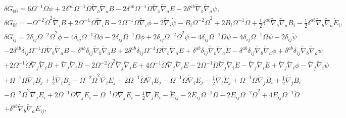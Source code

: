 \documentclass[aps]{revtex4}
\begin{document}
\begin{eqnarray}
&&\delta G_{00}=6 \Omega^{-1} \dot{\Omega} \dot{\psi} + 2 \delta^{ab} \Omega^{-1} \dot{\Omega} \tilde{\nabla}_{b}\tilde{\nabla}_{a}B - 2 \delta^{ab} \Omega^{-1} \dot{\Omega} \tilde{\nabla}_{b}\tilde{\nabla}_{a}\dot{E} - 2 \delta^{ab} \tilde{\nabla}_{b}\tilde{\nabla}_{a}\psi,
\nonumber\\
&&\delta G_{0i}=- \Omega^{-2} \dot{\Omega}^2 \tilde{\nabla}_{i}B + 2 \Omega^{-1} \ddot{\Omega} \tilde{\nabla}_{i}B - 2 \Omega^{-1} \dot{\Omega} \tilde{\nabla}_{i}\phi - 2 \tilde{\nabla}_{i}\dot{\psi}
- B_{i} \Omega^{-2} \dot{\Omega}^2 + 2 B_{i} \Omega^{-1} \ddot{\Omega} + \tfrac{1}{2} \delta^{ab} \tilde{\nabla}_{b}\tilde{\nabla}_{a}B_{i} -  \tfrac{1}{2} \delta^{ab} \tilde{\nabla}_{b}\tilde{\nabla}_{a}\dot{E}_{i},
\nonumber\\
&&\delta G_{ij}=2 \delta_{ij} \Omega^{-2} \dot{\Omega}^2 \phi - 4 \delta_{ij} \Omega^{-1} \ddot{\Omega} \phi - 2 \delta_{ij} \Omega^{-1} \dot{\Omega} \dot{\phi} + 2 \delta_{ij} \Omega^{-2} \dot{\Omega}^2 \psi - 4 \delta_{ij} \Omega^{-1} \ddot{\Omega} \psi - 4 \delta_{ij} \Omega^{-1} \dot{\Omega} \dot{\psi} - 2 \delta_{ij} \ddot{\psi} 
\nonumber\\
&&- 2 \delta^{ab} \delta_{ij} \Omega^{-1} \dot{\Omega} \tilde{\nabla}_{b}\tilde{\nabla}_{a}B -  \delta^{ab} \delta_{ij} \tilde{\nabla}_{b}\tilde{\nabla}_{a}\dot{B} + 2 \delta^{ab} \delta_{ij} \Omega^{-1} \dot{\Omega} \tilde{\nabla}_{b}\tilde{\nabla}_{a}\dot{E} + \delta^{ab} \delta_{ij} \tilde{\nabla}_{b}\tilde{\nabla}_{a}\ddot{E} -  \delta^{ab} \delta_{ij} \tilde{\nabla}_{b}\tilde{\nabla}_{a}\phi + \delta^{ab} \delta_{ij} \tilde{\nabla}_{b}\tilde{\nabla}_{a}\psi 
\nonumber\\
&&+ 2 \Omega^{-1} \dot{\Omega} \tilde{\nabla}_{j}\tilde{\nabla}_{i}B + \tilde{\nabla}_{j}\tilde{\nabla}_{i}\dot{B} - 2 \Omega^{-2} \dot{\Omega}^2 \tilde{\nabla}_{j}\tilde{\nabla}_{i}E + 4 \Omega^{-1} \ddot{\Omega} \tilde{\nabla}_{j}\tilde{\nabla}_{i}E - 2 \Omega^{-1} \dot{\Omega} \tilde{\nabla}_{j}\tilde{\nabla}_{i}\dot{E} -  \tilde{\nabla}_{j}\tilde{\nabla}_{i}\ddot{E} + \tilde{\nabla}_{j}\tilde{\nabla}_{i}\phi -  \tilde{\nabla}_{j}\tilde{\nabla}_{i}\psi
\nonumber\\
&&+\Omega^{-1} \dot{\Omega} \tilde{\nabla}_{i}B_{j} + \tfrac{1}{2} \tilde{\nabla}_{i}\dot{B}_{j} -  \Omega^{-2} \dot{\Omega}^2 \tilde{\nabla}_{i}E_{j} + 2 \Omega^{-1} \ddot{\Omega} \tilde{\nabla}_{i}E_{j} -  \Omega^{-1} \dot{\Omega} \tilde{\nabla}_{i}\dot{E}_{j} -  \tfrac{1}{2} \tilde{\nabla}_{i}\ddot{E}_{j} + \Omega^{-1} \dot{\Omega} \tilde{\nabla}_{j}B_{i} + \tfrac{1}{2} \tilde{\nabla}_{j}\dot{B}_{i} 
\nonumber\\
&&-  \Omega^{-2} \dot{\Omega}^2 \tilde{\nabla}_{j}E_{i} 
+ 2 \Omega^{-1} \ddot{\Omega} \tilde{\nabla}_{j}E_{i} -  \Omega^{-1} \dot{\Omega} \tilde{\nabla}_{j}\dot{E}_{i} -  \tfrac{1}{2} \tilde{\nabla}_{j}\ddot{E}_{i}- \ddot{E}_{ij} - 2 \dot{E}_{ij} \Omega^{-1} \dot{\Omega} - 2 E_{ij} \Omega^{-2} \dot{\Omega}^2 + 4 E_{ij} \Omega^{-1} \ddot{\Omega} 
\nonumber\\
&&+ \delta^{ab} \tilde{\nabla}_{b}\tilde{\nabla}_{a}E_{ij},
\label{AP77}
\end{eqnarray}
\end{document}
